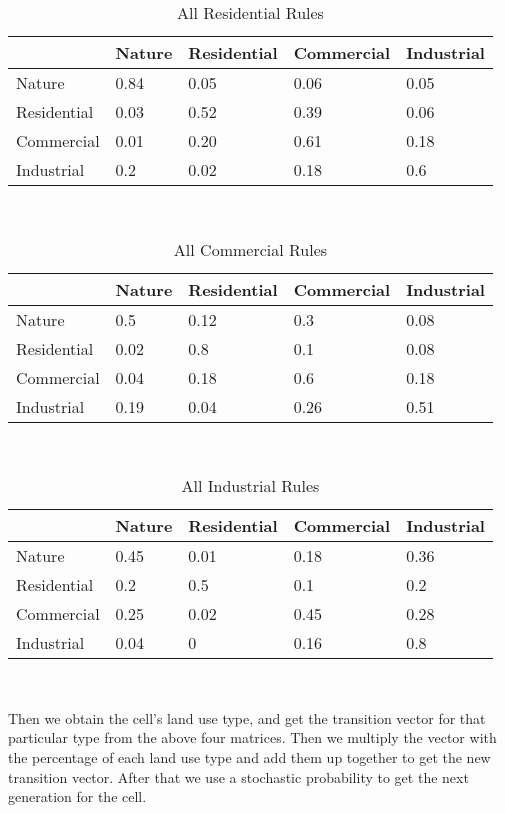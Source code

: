 \documentclass[a4paper,12pt]{report}
\begin{document}
\begin{table}[ht]
\centering
\begin{tabular}{l|l|l|l|l}
            & Nature & Residential & Commercial & Industrial \\ \hline
Nature      & 0.84   & 0.05        & 0.06       & 0.05       \\ \hline
Residential & 0.03   & 0.52        & 0.39       & 0.06       \\ \hline
Commercial  & 0.01   & 0.20        & 0.61       & 0.18       \\ \hline
Industrial  & 0.2    & 0.02        & 0.18       & 0.6       
\end{tabular}
\\[10pt]
\caption{All Residential Rules}
\end{table}

\begin{table}[ht]
\centering
\begin{tabular}{l|l|l|l|l}
            & Nature & Residential & Commercial & Industrial \\ \hline
Nature      & 0.5    & 0.12        & 0.3        & 0.08       \\ \hline
Residential & 0.02   & 0.8         & 0.1        & 0.08       \\ \hline
Commercial  & 0.04   & 0.18        & 0.6        & 0.18       \\ \hline
Industrial  & 0.19   & 0.04        & 0.26       & 0.51      
\end{tabular}
\\[10pt]
\caption{All Commercial Rules}
\end{table}

\begin{table}[ht]
\centering
\begin{tabular}{l|l|l|l|l}
            & Nature & Residential & Commercial & Industrial \\ \hline
Nature      & 0.45   & 0.01        & 0.18       & 0.36       \\ \hline
Residential & 0.2    & 0.5         & 0.1        & 0.2        \\ \hline
Commercial  & 0.25   & 0.02        & 0.45       & 0.28       \\ \hline
Industrial  & 0.04   & 0           & 0.16       & 0.8       
\end{tabular}
\\[10pt]
\caption{All Industrial Rules}
\end{table}

\pagebreak
Then we obtain the cell's land use type, and get the transition vector for that particular type from the above four matrices. Then we multiply the vector with the percentage of each land use type and add them up together to get the new transition vector. After that we use a stochastic probability to get the next generation for the cell.  
\end{document}
